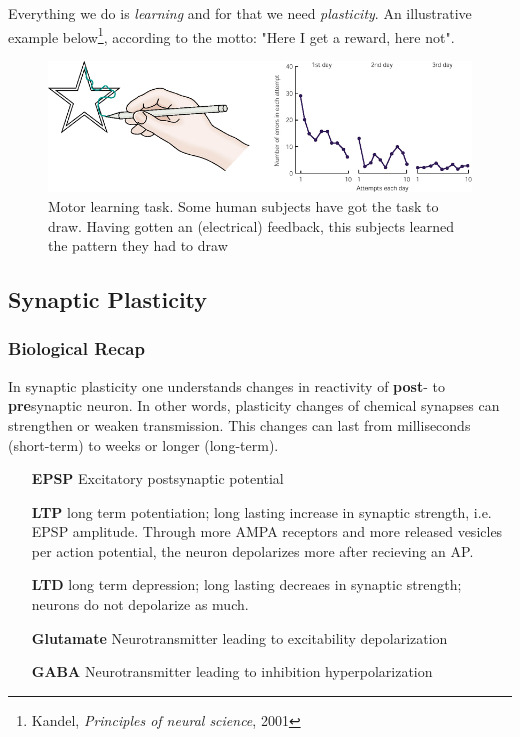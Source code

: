 \documentclass[main]{subfiles}
\begin{document}
%
Everything we do is \textit{learning} and for that we need \textit{plasticity}. An illustrative example below\footnote{Kandel, \textit{Principles of neural science}, 2001}, according to the motto: "Here I get a reward, here not".
%
\begin{figure}[H]
    \centering
    \includegraphics[width=\textwidth]{03_PlasticityInTheBrain/figures/motorlearning.jpg}
    \caption{Motor learning task. Some human subjects have got the task to draw. Having gotten an (electrical) feedback, this subjects learned the pattern they had to draw}
    \label{fig:motorlearning}
\end{figure}

\subsection{Synaptic Plasticity}

\subsubsection{Biological Recap}
In synaptic plasticity one understands changes in reactivity of \textbf{post}- to \textbf{pre}synaptic neuron. In other words, plasticity changes of chemical synapses can strengthen or weaken transmission. This changes can last from milliseconds (short-term) to weeks or longer (long-term).
\begin{itemize}
    \item[\textbf{EPSP}] Excitatory postsynaptic potential
    \item[\textbf{LTP}] long term potentiation; long lasting increase in synaptic strength, i.e. EPSP amplitude. Through more AMPA receptors and more released vesicles per action potential, the neuron depolarizes more after recieving an AP.
    \item[\textbf{LTD}] long term depression; long lasting decreaes in synaptic strength; neurons do not depolarize as much. 
    \item[\textbf{Glutamate}] Neurotransmitter leading to excitability depolarization
    \item[\textbf{GABA}] Neurotransmitter leading to inhibition hyperpolarization
\end{itemize}
\end{document}
